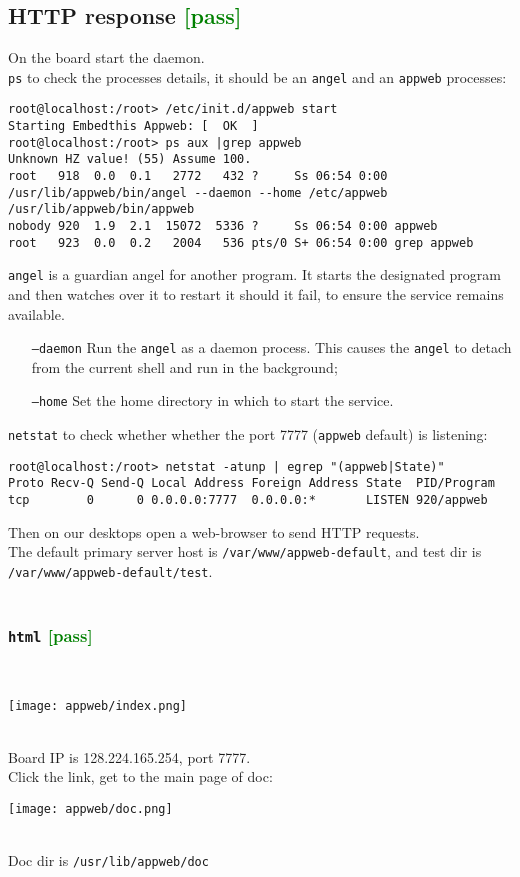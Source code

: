 \documentclass[a4paper]{report}
\begin{document}
\subsection{HTTP response \textcolor{green}{[pass]}}
On the board start the daemon.\\
{\tt ps} to check the processes details, it should be an {\tt angel} and an {\tt appweb}
processes:
\begin{lstlisting}
root@localhost:/root> /etc/init.d/appweb start
Starting Embedthis Appweb: [  OK  ]
root@localhost:/root> ps aux |grep appweb
Unknown HZ value! (55) Assume 100.
root   918  0.0  0.1   2772   432 ?     Ss 06:54 0:00 /usr/lib/appweb/bin/angel --daemon --home /etc/appweb /usr/lib/appweb/bin/appweb
nobody 920  1.9  2.1  15072  5336 ?     Ss 06:54 0:00 appweb
root   923  0.0  0.2   2004   536 pts/0 S+ 06:54 0:00 grep appweb
\end{lstlisting}
{\tt angel} is a guardian angel for another program. It starts the designated 
program and then watches over it to restart it should it fail, 
to ensure the service remains available.
\begin{itemize}
    \item[{\tt --daemon}] Run the {\tt angel} as a daemon process. 
          This causes the {\tt angel} to detach from the current shell and run in the background;
    \item[{\tt --home}] Set the home directory in which to start the service.
\end{itemize}
{\tt netstat} to check whether whether the port 7777 ({\tt appweb} default) is listening:
\begin{lstlisting}
root@localhost:/root> netstat -atunp | egrep "(appweb|State)"
Proto Recv-Q Send-Q Local Address Foreign Address State  PID/Program
tcp        0      0 0.0.0.0:7777  0.0.0.0:*       LISTEN 920/appweb
\end{lstlisting}
Then on our desktops open a web-browser to send HTTP requests.\\
The default primary server host is {\tt /var/www/appweb-default}, and 
test dir is {\tt /var/www/appweb-default/test}.\\\\
\subsubsection{{\tt html} \textcolor{green}{[pass]}}
\\[\intextsep]
\begin{minipage}{\textwidth}
\centering
\texttt{[image: appweb/index.png]}
\end{minipage}
\\[\intextsep]
Board IP is 128.224.165.254, port 7777.\\
Click the link, get to the main page of doc:
\\[\intextsep]
\begin{minipage}{\textwidth}
\centering
\texttt{[image: appweb/doc.png]}
\end{minipage}
\\[\intextsep]
Doc dir is {\tt /usr/lib/appweb/doc}
\end{document}
